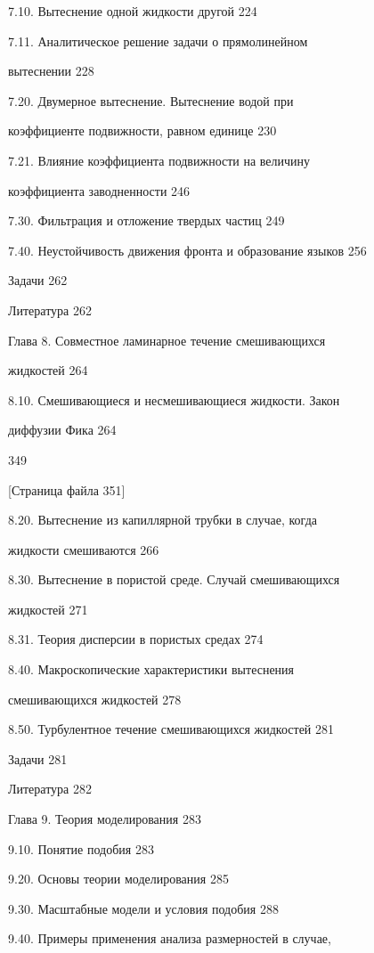 \documentclass[
  11pt,
]{article}
\begin{document}
7.10. Вытеснение одной жидкости другой 224 \par
7.11. Аналитическое решение задачи о прямолинейном  \par
вытеснении 228 \par
7.20. Двумерное вытеснение. Вытеснение водой при  \par
коэффициенте подвижности, равном единице 230 \par
7.21. Влияние коэффициента подвижности на величину  \par
коэффициента заводненности 246 \par
7.30. Фильтрация и отложение твердых частиц 249 \par
7.40. Неустойчивость движения фронта и образование языков 256 \par
Задачи 262 \par
Литература 262 \par
Глава 8. Совместное ламинарное течение смешивающихся \par
жидкостей 264 \par
8.10. Смешивающиеся и несмешивающиеся жидкости. Закон \par
диффузии Фика 264 \par
349 \par
\smallskip
\smallskip
\smallskip
{[}Страница файла 351{]}\par
8.20. Вытеснение из капиллярной трубки в случае, когда  \par
жидкости смешиваются 266 \par
8.30. Вытеснение в пористой среде. Случай смешивающихся \par
жидкостей 271 \par
8.31. Теория дисперсии в пористых средах 274 \par
8.40. Макроскопические характеристики вытеснения  \par
смешивающихся жидкостей 278 \par
8.50. Турбулентное течение смешивающихся жидкостей 281 \par
Задачи 281 \par
Литература 282 \par
Глава 9. Теория моделирования 283 \par
9.10. Понятие подобия 283 \par
9.20. Основы теории моделирования 285 \par
9.30. Масштабные модели и условия подобия 288 \par
9.40. Примеры применения анализа размерностей в случае, \par
\end{document}
